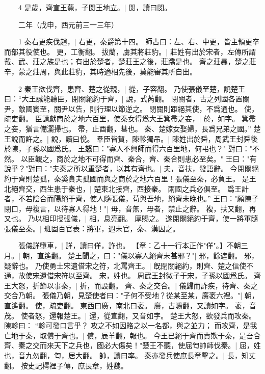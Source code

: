 　　4 是歲，齊宣王薨，子閔王地立。|{
	閔，讀曰閔。
}

　　二年（戊申，西元前三一三年）

　　1 秦右更疾伐趙，|{
	右更，秦爵第十四。
	師古曰：左、右、中更，皆主領更卒而部其役使也。
	更，工衡翻。
}
拔藺，虜其將莊豹。|{
	莊姓有出於宋者，左傳所謂戴、武、莊之族是也；有出於楚者，楚莊王之後，莊蹻是也。
	齊之莊暴，楚之莊辛，蒙之莊周，與此莊豹，其時適相先後，莫能審其所自出。
}

　　2 秦王欲伐齊，患齊、楚之從親，|{
	從，子容翻。
}
乃使張儀至楚，說楚王曰：“大王誠能聽臣，閉關絕約于齊，|{
	說，式芮翻。
	閉關者，古之列國各置關尹，敵國賓至，關尹以告，則行理以節逆之。
	閉關則距絕其使，不爲通也。
	使，疏吏翻。
}
臣請獻商於之地六百里，使秦女得爲大王箕帚之妾，|{
	於，如字。
	箕帚之妾，猶言備灑掃也。
	帚，止酉翻，彗也。
}
秦、楚嫁女娶婦，長爲兄弟之國。”
楚王說而許之。|{
	說，讀曰悅。
}
羣臣皆賀，陳軫獨吊。|{
	陳姓出於舜，周武王封舜後於陳，子孫以國爲氏。
}
王\textbf{\large{怒}}曰："寡人不興師而得六百里地，何弔也？"
對曰："不然。
	以臣觀之，商於之地不可得而齊、秦合，齊、秦合則患必至矣。" 王曰："有說乎？"對曰："夫秦之所以重楚者，以其有齊也。|{
	夫，音扶，發語辭。
}
今閉關絕約于齊則楚孤，秦奚貪夫孤國而與之商於之地六百里！張儀至秦，必負王。
	是王北絕齊交，西生患于秦也，|{
	楚東北接齊，西接秦。
}
兩國之兵必俱至。
	爲王計者，不若陰合而陽絕于齊，使人隨張儀，苟與吾地，絕齊未晚也。”
	王曰："願陳子閉口，毋複言，以待寡人得地！"|{
	毋，音無，毋者，禁止之辭。
	複，扶又翻，再又也。
}
乃以相印授張儀，|{
	相，息亮翻。
}
厚賜之。
遂閉關絕約于齊，使一將軍隨張儀至秦。|{
	班固百官表：將軍，週末官，秦、漢因之。
}

　　張儀詳墮車，|{
	詳，讀曰佯，詐也。
}
【章：乙十一行本正作"佯"。】不朝三月。|{
	朝，直遙翻。
}
楚王聞之，曰："儀以寡人絕齊未甚邪？"|{
	邪，餘遮翻。
	邪，疑辭也。
}
乃使勇士宋遺借宋之符，北罵齊王。|{
	旣閉關絕約，則齊、楚之信使不通，故使宋遺借宋符以至齊。
	宋，姓也。
	周武王封微子于宋，子孫以國爲氏。
}
齊王大怒，折節以事秦，|{
	折，而設翻。
}
齊、秦之交合。|{
	儀歸而詐疾，待齊、秦之交合乃朝。
}
張儀乃朝，見楚使者曰："子何不受地？從某至某，廣袤六裡。"|{
	朝，直遙翻。
	使，疏吏翻。
	東西曰廣，南北曰袤。
	廣，古曠翻，又讀如字。
	袤，音茂。
}
使者怒，還報楚王。|{
	還，從宣翻，又音如字。
}
楚王大怒，欲發兵而攻秦。
陳軫曰：
	“軫可發口言乎？
	攻之不如因賂之以一名都，與之並力；
	而攻齊，是我亡地于秦，取償于齊也。|{
	償，辰羊翻，報也。
}
今王已絕于齊而責欺于秦，是吾合齊、秦之交而來天下之兵也，國必大傷矣！"楚王不聽，使屈匄帥師伐秦。|{
	屈，姓也，音九勿翻，匄，居大翻。
	帥，讀曰率。
}
秦亦發兵使庶長章擊之。|{
	長，知丈翻。
	按史記樗裡子傳，庶長章，姓魏。
}


